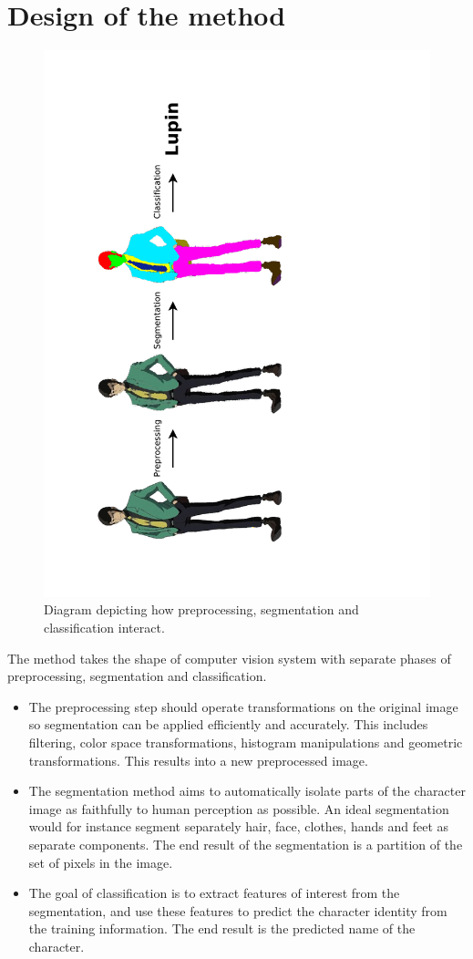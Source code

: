 \section{Design of the method}

\begin{figure}[htb!]
\centerline{
\includegraphics[height=1.2\textwidth,angle=270,clip=true,trim=0 0 6cm 0]{images/visionSystemDiagram.pdf}
}
\caption{Diagram depicting how preprocessing, segmentation and classification interact.}
\end{figure}

The method takes the shape of computer vision system with separate phases of preprocessing, segmentation and classification.

\begin{itemize}
\item The preprocessing step should operate transformations on the original image so segmentation can be applied efficiently and accurately. This includes filtering, color space transformations, histogram manipulations and geometric transformations. This results into a new preprocessed image.
\item The segmentation method aims to automatically isolate parts of the character image as faithfully to human perception as possible. An ideal segmentation would for instance segment separately hair, face, clothes, hands and feet as separate components.
The end result of the segmentation is a partition of the set of pixels in the image.
\item The goal of classification is to extract features of interest from the segmentation, and use these features to predict the character identity from the training information. The end result is the predicted name of the character.
\end{itemize}


